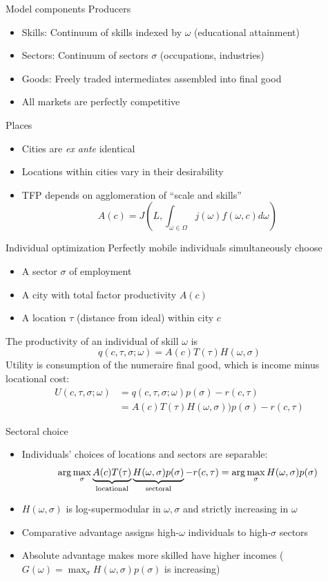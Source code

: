 \documentclass[10pt,notes=hide]{beamer}
\begin{document}
\begin{frame}{Model components}
Producers
\begin{itemize}
\item Skills: Continuum of skills indexed by $\omega$ (educational attainment)
\item Sectors: Continuum of sectors $\sigma$ (occupations, industries)
\item Goods: Freely traded intermediates assembled into final good
\item All markets are perfectly competitive
\end{itemize}
Places
\begin{itemize}
\item Cities are \emph{ex ante} identical
\item Locations within cities vary in their desirability
\item TFP depends on agglomeration of ``scale and skills''
\[
A(c)=J\left(L,\int_{\omega\in\Omega}j(\omega)f(\omega,c)d\omega\right)
\]
\end{itemize}
\end{frame}
\begin{frame}{Individual optimization}
Perfectly mobile individuals simultaneously choose
\begin{itemize}
\item A sector $\sigma$ of employment
\item A city with total factor productivity $A(c)$
\item A location $\tau$ (distance from ideal) within city $c$
\end{itemize}
The productivity of an individual of skill $\omega$ is
\[
q(c,\tau,\sigma;\omega)=A(c)T(\tau)H(\omega,\sigma)
\]
Utility is consumption of the numeraire final good, which is income minus locational cost:
\begin{align*}
U(c,\tau,\sigma;\omega) & =q(c,\tau,\sigma;\omega)p(\sigma)-r(c,\tau)\\
 & =A(c)T(\tau)H(\omega,\sigma))p(\sigma)-r(c,\tau)
\end{align*}
\end{frame}
\begin{frame}{Sectoral choice}
\begin{itemize}
\item Individuals' choices of locations and sectors are separable: 
\begin{align*}
\arg\max_{\sigma}\underbrace{A(c)T(\tau)}_{\textnormal{locational}}\underbrace{H(\omega,\sigma)p(\sigma)}_{\textnormal{sectoral}}-r(c,\tau)=\arg\max_{\sigma}H(\omega,\sigma)p(\sigma)
\end{align*}
\item $H(\omega,\sigma)$ is log-supermodular in $\omega,\sigma$ and strictly increasing in $\omega$
\item Comparative advantage assigns high-$\omega$ individuals to high-$\sigma$ sectors
\item Absolute advantage makes more skilled have higher incomes ($G(\omega)=\max_{\sigma}H(\omega,\sigma)p(\sigma)$
is increasing)
\end{itemize}
\end{frame}
\end{document}
